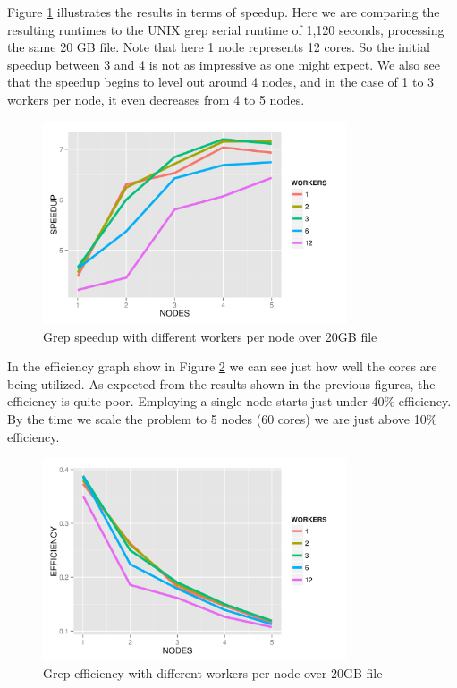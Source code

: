 \documentclass{article}
\begin{document}
Figure \ref{fig:workNodeSpeed} illustrates the results in terms of speedup.
Here we are comparing the resulting runtimes to the UNIX grep serial runtime of
1,120 seconds, processing the same 20 GB file. Note that here 1 node represents
12 cores. So the initial speedup between 3 and 4 is not as impressive as one
might expect. We also see that the speedup begins to level out around 4 nodes,
and in the case of 1 to 3 workers per node, it even decreases from 4 to 5
nodes.

    \begin{figure}[H]
        \centering
        \includegraphics[width=90mm]{images/workerPerNodeSpeedup.png}
        \caption{Grep speedup with different workers per node over 20GB file}
        \label{fig:workNodeSpeed}
    \end{figure}

In the efficiency graph show in Figure \ref{fig:workNodeEff} we can see just
how well the cores are being utilized. As expected from the results shown in
the previous figures, the efficiency is quite poor. Employing a single node
starts just under 40\% efficiency. By the time we scale the problem to 5 nodes
(60 cores) we are just above 10\% efficiency.

    \begin{figure}[H]
        \centering
        \includegraphics[width=90mm]{images/workerPerNodeEfficiency.png}
        \caption{Grep efficiency with different workers per node over 20GB file}
        \label{fig:workNodeEff}
    \end{figure}
\end{document}
